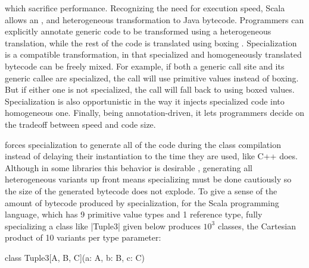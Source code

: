  which sacrifice performance. Recognizing the need for execution speed, Scala  \cite{iuli-thesis} allows an ,  and  heterogeneous transformation to Java bytecode. Programmers can explicitly annotate generic code to be transformed using a heterogeneous translation, while the rest of the code is translated using boxing \cite{java-erasure}. Specialization is a compatible transformation, in that specialized and homogeneously translated bytecode can be freely mixed. For example, if both a generic call site and its generic callee are specialized, the call will use primitive values instead of boxing. But if either one is not specialized, the call will fall back to using boxed values. Specialization is also opportunistic in the way it injects specialized code into homogeneous one. Finally, being annotation-driven, it lets programmers decide on the tradeoff between speed and code size.

 forces specialization to generate all  of the code during the class compilation instead of delaying their instantiation to the time they are used, like C++ does. Although in some libraries this behavior is desirable \cite{gil-adobe}, generating all heterogeneous variants up front means specializing must be done cautiously so the size of the generated bytecode does not explode. To give a sense of the amount of bytecode produced by specialization, for the Scala programming language, which has 9 primitive value types and 1 reference type, fully specializing a class like |Tuple3| given below produces $10^3$ classes, the Cartesian product of 10 variants per type parameter: 

\begin{lstlisting-nobreak}
 class Tuple3[A, B, C](a: A, b: B, c: C)
\end{lstlisting-nobreak}

